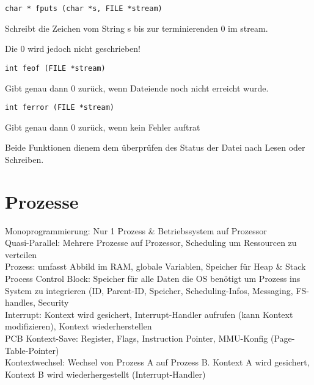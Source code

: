 \begin{multicols*}{5}
			\vspace{-6pt}
			\begin{lstlisting}
char * fputs (char *s, FILE *stream)
			\end{lstlisting}
			\vspace{-6pt}
			\begin{compactitem}[$\bullet$]
			\item Schreibt die Zeichen vom String s bis zur terminierenden 0 im stream. 
			\item Die 0 wird jedoch nicht geschrieben!
			\end{compactitem}

			\vspace{-6pt}
			\begin{lstlisting}
int feof (FILE *stream)
			\end{lstlisting}
			\vspace{-6pt}
			\begin{compactitem}[$\bullet$]
			\item Gibt genau dann 0 zurück, wenn Dateiende noch nicht erreicht wurde.
			\end{compactitem}
		
			\vspace{-6pt}
			\begin{lstlisting}
int ferror (FILE *stream)
			\end{lstlisting}
			\vspace{-6pt}
			\begin{compactitem}[$\bullet$]
			\item Gibt genau dann 0 zurück, wenn kein Fehler auftrat
			\item Beide Funktionen dienem dem überprüfen des Status der Datei nach Lesen oder Schreiben.
			\end{compactitem}
	

	

\section{Prozesse}

	\textcolor{h}{Monoprogrammierung:} Nur 1 Prozess \& Betriebssystem auf Prozessor\\
	\textcolor{h}{Quasi-Parallel:} Mehrere Prozesse auf Prozessor, Scheduling um Ressourcen zu verteilen\\
	\textcolor{h}{Prozess:} umfasst Abbild im RAM, globale Variablen, Speicher für Heap \& Stack\\
	\textcolor{h}{Process Control Block:} Speicher für alle Daten die OS benötigt um Prozess ins System zu integrieren (ID, Parent-ID, Speicher, Scheduling-Infos, Messaging, FS-handles, Security\\
	\textcolor{h}{Interrupt:} Kontext wird gesichert, Interrupt-Handler aufrufen (kann Kontext modifizieren), Kontext wiederherstellen\\
	\textcolor{h}{PCB Kontext-Save:} Register, Flags, Instruction Pointer, MMU-Konfig (Page-Table-Pointer)\\
	\textcolor{h}{Kontextwechsel:} Wechsel von Prozess A auf Prozess B. Kontext A wird gesichert, Kontext B wird wiederhergestellt (Interrupt-Handler)\\
	 

\end{multicols*}
